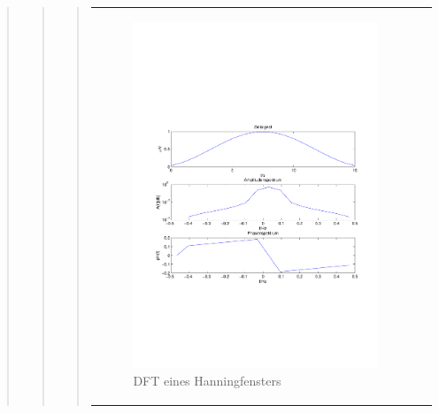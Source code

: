 \begin{quote}
\begin{quote}
\begin{quote}
\begin{center}
\begin{tabular}{ll}
\begin{minipage}{0.6\textwidth}
                    \end{minipage}
                    \begin{minipage}{0.6\textwidth}
    
                        \begin{figure}[H]
                            \label{fig:}
                            \includegraphics[scale=0.5, trim = 1.5cm 7cm 1.5cm 8cm, clip]{./Bilder/HanningDFT}
                            \caption{DFT eines Hanningfensters}
                        \end{figure}
                    \vspace{-1.5em}
    
                    \end{minipage}
    

\end{tabular}
\end{center}
\end{quote}
\end{quote}
\end{quote}
